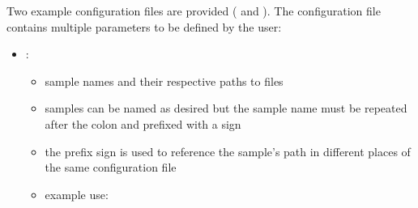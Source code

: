 \documentclass[letterpaper,10pt,english]{sphinxhowto}
\begin{document}
\sphinxAtStartPar
Two example configuration files are provided ( and ). The configuration file  contains multiple parameters to be defined by the user:
\begin{itemize}
\item {} 
\sphinxAtStartPar
{}:
\begin{itemize}
\item {} 
\sphinxAtStartPar
sample names and their respective paths to  files

\item {} 
\sphinxAtStartPar
samples can be named as desired but the sample name must be repeated after the colon and prefixed with a \sphinxtitleref{\&} sign

\item {} 
\sphinxAtStartPar
the \sphinxtitleref{\&} prefix sign is used to reference the sample’s path in different places of the same configuration file

\item {} 
\sphinxAtStartPar
example use:

\end{itemize}

\end{itemize}
\end{document}
